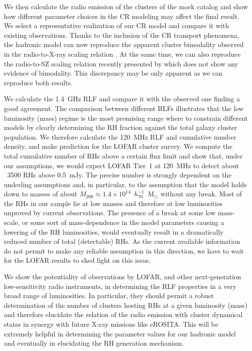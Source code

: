 \documentclass[traditabstract]{aa}
\begin{document}
We then calculate the radio emission of the clusters of the mock catalog and show how different parameter choices in the CR modeling may affect the final result. We select a representative realization of our CR model and compare it with existing observations. Thanks to the inclusion of the CR transport phenomena, the hadronic model can now reproduce the apparent cluster bimodality observed in the radio-to-X-ray scaling relation \citep{2009A&A...507..661B,2011A&A...527A..99E}. At the same time, we can also reproduce the radio-to-SZ scaling relation recently presented by \cite{2012MNRAS.421L.112B} which does not show any evidence of bimodality. This discrepancy may be only apparent as we can reproduce both results.

We calculate the 1.4~GHz RLF and compare it with the observed one \citep{1999NewA....4..141G} finding a good agreement. The comparison between different RLFs illustrates that the low luminosity (mass) regime is the most promising range where to constrain different models by clearly determining the RH fraction against the total galaxy cluster population. We therefore calculate the 120~MHz RLF and cumulative number density, and make prediction for the LOFAR cluster survey. We compute the total cumulative number of RHs above a certain flux limit and show that, under our assumptions, we would expect LOFAR Tier~1 at 120~MHz to detect about ~3500 RHs above 0.5~mJy. The precise number is strongly dependent on the underling assumptions and, in particular, to the assumption that the model holds down to masses of about $M_{200}\approx1.4\times10^{14}$~$h_{70}^{-1}$~M$_{\odot}$ without any break. Most of the RHs in our sample lie at low masses and therefore at low luminosities unproved by current observations. The presence of a break at some low mass-scale, or some sort of mass-dependence in the model parameters causing a lowering of the RH luminosities, would eventually result in a dramatically reduced number of total (detectable) RHs. As the current available information do not permit to make any reliable assumption in this direction, we have to wait for the LOFAR results to shed light on this issue. 

We show the potentiality of observations by LOFAR, and other next-generation low-sensitivity radio instruments, in determining the RLF properties in a very broad range of luminosities. In particular, they should permit a robust determination of the number of clusters hosting RHs at a given luminosity (mass) and therefore elucidate the relation of the radio emission with cluster dynamical states in synergy with future X-ray missions like eROSITA. This will be extremely helpful in determining the parameter values for our hadronic model and eventually in elucidating the RH generation mechanism.
\end{document}
